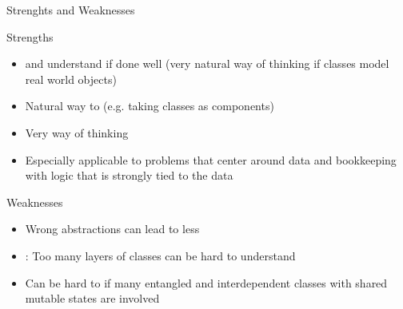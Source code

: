 \begin{frame}{Strenghts and Weaknesses}
		
\begin{block}{Strengths}
	\only<+->{}
	\begin{itemize}
		\item<+->  and understand if done well (very natural way of thinking if classes model real world objects)
		\item<+-> Natural way to  (e.g. taking classes as components)
		\item<+-> Very  way of thinking
		\item<+-> Especially applicable to problems that center around data and bookkeeping with logic that is strongly tied to the data
	\end{itemize}
\end{block}
\begin{block}{Weaknesses}
\begin{itemize}
	\item<+-> Wrong abstractions can lead to less 
	\item<+-> : Too many layers of classes can be hard to understand
	\item<+-> Can be hard to  if many entangled and interdependent classes with shared mutable states are involved 
\end{itemize}
\end{block}
\end{frame}